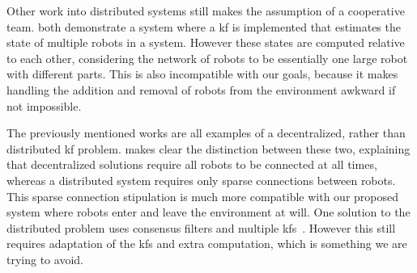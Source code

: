\documentclass[thesis.tex]{subfile}
\begin{document}
Other work into distributed systems still makes the assumption of a cooperative team. \textcite{Sanderson1997, Roumeliotis2002} both demonstrate a system where a \gls{kf} is implemented that estimates the state of multiple robots in a system. However these states are computed relative to each other, considering the network of robots to be essentially one large robot with different parts. This is also incompatible with our goals, because it makes handling the addition and removal of robots from the environment awkward if not impossible.

The previously mentioned works are all examples of a decentralized, rather than distributed \gls{kf} problem. \textcite{Olfati-Saber2005} makes clear the distinction between these two, explaining that decentralized solutions require all robots to be connected at all times, whereas a distributed system requires only sparse connections between robots. This sparse connection stipulation is much more compatible with our proposed system where robots enter and leave the environment at will. One solution to the distributed problem uses consensus filters and multiple \glspl{kf}~\cite{Olfati-Saber2005}. However this still requires adaptation of the \glspl{kf} and extra computation, which is something we are trying to avoid.
\end{document}
